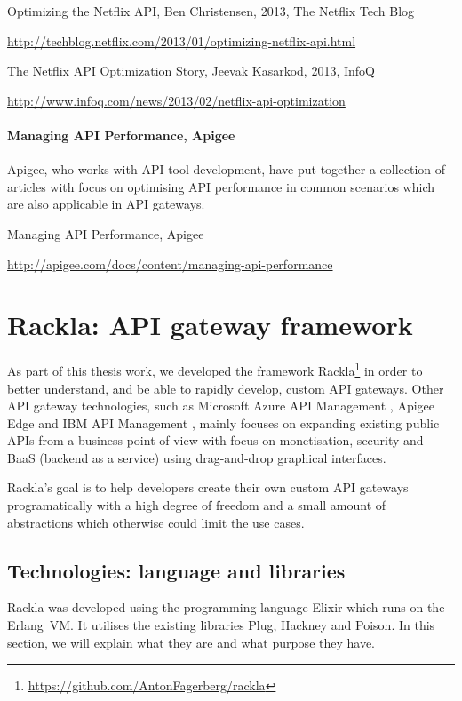 \documentclass{cslthse-msc}
\begin{document}
\vspace{5mm}

\noindent Optimizing the Netflix API, Ben Christensen, 2013, The Netflix Tech Blog

\noindent \url{http://techblog.netflix.com/2013/01/optimizing-netflix-api.html}

\vspace{5mm}

\noindent The Netflix API Optimization Story, Jeevak Kasarkod, 2013, InfoQ

\noindent \url{http://www.infoq.com/news/2013/02/netflix-api-optimization}


\subsubsection{Managing API Performance, Apigee}
Apigee, who works with API tool development, have put together a collection of articles with focus on optimising API performance in common scenarios which are also applicable in API gateways.

\vspace{5mm}

\noindent Managing API Performance, Apigee

\noindent \url{http://apigee.com/docs/content/managing-api-performance}

\chapter{Rackla: API gateway framework}

As part of this thesis work, we developed the framework Rackla\footnote{\url{https://github.com/AntonFagerberg/rackla}} in order to better understand, and be able to rapidly develop, custom API gateways. Other API gateway technologies, such as Microsoft Azure API Management \cite{azure_api_management}, Apigee Edge \cite{apigee_edge} and IBM API Management \cite{ibm_api_management}, mainly focuses on expanding existing public APIs from a business point of view with focus on monetisation, security and BaaS (backend as a service) using drag-and-drop graphical interfaces. 

Rackla's goal is to help developers create their own custom API gateways programatically with a high degree of freedom and a small amount of abstractions which otherwise could limit the use cases.

\section{Technologies: language and libraries}
Rackla was developed using the programming language Elixir which runs on the Erlang~VM. It utilises the existing libraries Plug, Hackney and Poison. In this section, we will explain what they are and what purpose they have.
\end{document}
